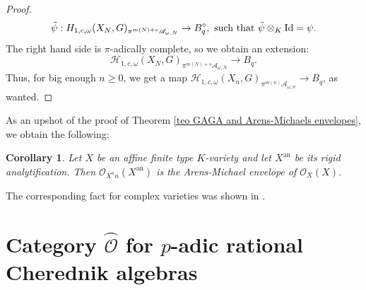 \documentclass{amsart}
\newtheorem{coro}[defi]{Corollary}
\newcommand{\OX}{\mathcal{O}}
\begin{document}
\begin{proof}
\begin{equation*}
    \Tilde{\psi}:H_{1,c,\omega}(X_N,G)_{\pi^{m(N)+s}\mathscr{A}_{\omega,N}}\rightarrow B^{\circ}_q, \textnormal{ such that }\Tilde{\psi}\otimes_K\operatorname{Id}=\psi.
\end{equation*}
The right hand side is $\pi$-adically complete, so we obtain an extension:
\begin{equation*}
    \mathcal{H}_{1,c,\omega}(X_N,G)_{\pi^{m(N)+s}\mathscr{A}_{\omega,N}}\rightarrow B_q.
\end{equation*}
Thus, for big enough $n\geq 0$, we get a map $\mathcal{H}_{1,c,\omega}(X_n,G)_{\pi^{m(n)}\mathscr{A}_{\omega,n}}\rightarrow B_q$, as wanted.
 \end{proof}
As an upshot of the proof of Theorem \ref{teo GAGA and Arens-Michaels envelopes}, we obtain the following:
\begin{coro}
Let $X$ be an affine finite type $K$-variety and let $X^{\operatorname{an}}$ be its rigid analytification. Then $\OX_{X^an}(X^{\operatorname{an}})$ is the Arens-Michael envelope of $\OX_X(X)$. 
\end{coro}
The corresponding fact for complex varieties was shown in \cite[Section 5]{TAYLOR1972183}.
\section{\texorpdfstring{Category $\wideparen{\OX}$ for $p$-adic rational Cherednik algebras}{}}\label{Section category O for p-adic rat Cher}
\end{document}
